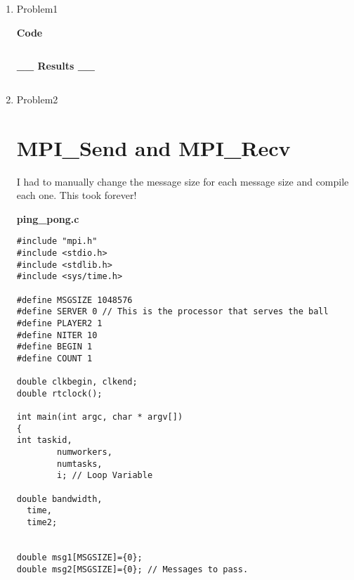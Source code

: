 \documentclass[11pt]{article}
\begin{document}
\begin{enumerate}
% 
\item Problem1 
\begin{center}
\textbf{Code}
\begin{lstlisting}
\end{lstlisting}
\textbf{\_\_ Results \_\_}
\begin{lstlisting}
\end{lstlisting}
\end{center}
% 
\item Problem2

\section{MPI\_Send and MPI\_Recv\\}
I had to manually change the message size for each message size and compile each one. This took forever!
\begin{center}
\textbf{ping\_pong.c}
\begin{lstlisting}
#include "mpi.h"
#include <stdio.h>
#include <stdlib.h>
#include <sys/time.h>

#define MSGSIZE 1048576
#define SERVER 0 // This is the processor that serves the ball                                                                                                                                                 
#define PLAYER2 1
#define NITER 10
#define BEGIN 1
#define COUNT 1

double clkbegin, clkend;
double rtclock();

int main(int argc, char * argv[])
{
int taskid,
        numworkers,
        numtasks,
        i; // Loop Variable                                                                                                                                                                                    

double bandwidth,
  time,
  time2;


double msg1[MSGSIZE]={0};
double msg2[MSGSIZE]={0}; // Messages to pass.                                                                                                                                                                 


\end{lstlisting}
\end{center}
\end{enumerate}
\end{document}
